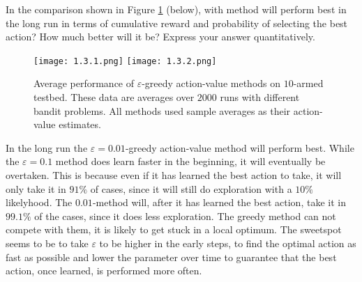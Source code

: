 \begin{exercise}
In the comparison shown in Figure \ref{fig:1.3} (below), with method will perform best in the long run in terms of cumulative reward and probability of selecting the best action?
How much better will it be?
Express your answer quantitatively.

\begin{figure}[H]
    \centering
    \subfloat
    {
        \texttt{[image: 1.3.1.png]}
    }
    \subfloat
    {
        \texttt{[image: 1.3.2.png]}
    }
    \hspace{0mm}
    \caption
    {
        Average performance of $\varepsilon$-greedy action-value methods on $10$-armed testbed.
        These data are averages over $2000$ runs with different bandit problems.
        All methods used sample averages as their action-value estimates.
    }
    \label{fig:1.3}
\end{figure}


\end{exercise}

\begin{solution}
In the long run the $\varepsilon = 0.01$-greedy action-value method will perform best. While the $\varepsilon = 0.1$ method does learn faster in the beginning, it will eventually be overtaken. This is because even if it has learned the best action to take, it will only take it in $91\%$ of cases, since it will still do exploration with a $10\%$ likelyhood. The $0.01$-method will, after it has learned the best action, take it in $99.1\%$ of the cases, since it does less exploration. The greedy method can not compete with them, it is likely to get stuck in a local optimum. The sweetspot seems to be to take $\varepsilon$ to be higher in the early steps, to find the optimal action as fast as possible and lower the parameter over time to guarantee that the best action, once learned, is performed more often.
\end{solution}
